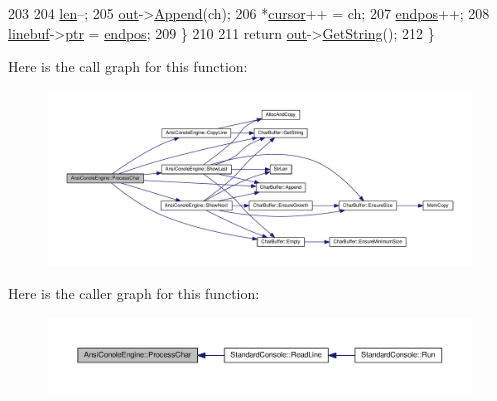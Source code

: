 \begin{DoxyCode}
203 
204         \hyperlink{classAnsiConoleEngine_ad5d65280df848947f5b2dda80dcf35c6}{len}--;
205         \hyperlink{classAnsiConoleEngine_ad6a604fc0a0f544907513076c72434f3}{out}->\hyperlink{classCharBuffer_a045b38735f7b3007c1b98d3d7b7feafe}{Append}(ch);
206         *\hyperlink{classAnsiConoleEngine_aea3df1b13bc8ecf2eb68ec693249800f}{cursor}++ = ch;
207         \hyperlink{classAnsiConoleEngine_a28852245082570631c7392411fec89cc}{endpos}++;
208         \hyperlink{classAnsiConoleEngine_a6bf88afa72a458e3687972f9e666cd86}{linebuf}->\hyperlink{classCharBuffer_a2d313433650506fd6609e6947729dfb0}{ptr} = \hyperlink{classAnsiConoleEngine_a28852245082570631c7392411fec89cc}{endpos};
209     \}
210 
211     \textcolor{keywordflow}{return} \hyperlink{classAnsiConoleEngine_ad6a604fc0a0f544907513076c72434f3}{out}->\hyperlink{classCharBuffer_a7dfd3feaaf80f318ba44efe15b1ec44b}{GetString}();
212 \}
\end{DoxyCode}


Here is the call graph for this function\+:\nopagebreak
\begin{figure}[H]
\begin{center}
\leavevmode
\includegraphics[width=350pt]{classAnsiConoleEngine_a7bb2dea88ddc5ae76643d2303fcc4bf1_cgraph}
\end{center}
\end{figure}




Here is the caller graph for this function\+:\nopagebreak
\begin{figure}[H]
\begin{center}
\leavevmode
\includegraphics[width=350pt]{classAnsiConoleEngine_a7bb2dea88ddc5ae76643d2303fcc4bf1_icgraph}
\end{center}
\end{figure}


